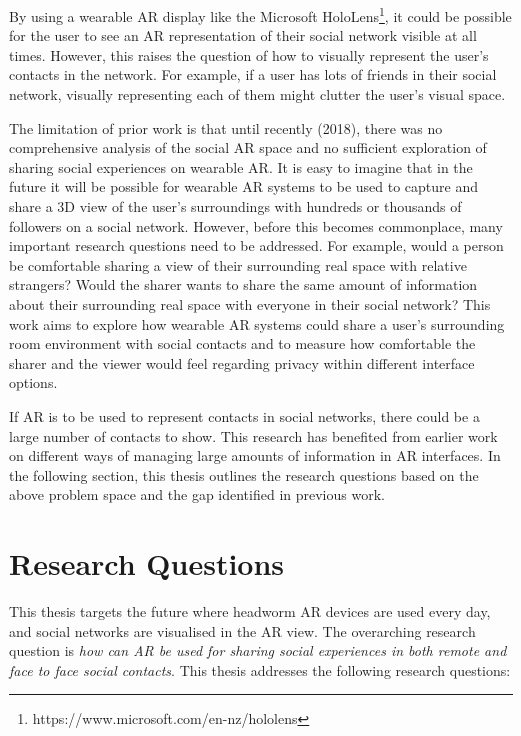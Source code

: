 By using a wearable AR display like the Microsoft HoloLens\footnote{https://www.microsoft.com/en-nz/hololens}, it could be possible for the user to see an AR representation of their social network visible at all times. However, this raises the question of how to visually represent the user's contacts in the network. For example, if a user has lots of friends in their social network, visually representing each of them might clutter the user's visual space.

The limitation of prior work is that until recently (2018), there was no comprehensive analysis of the social AR space and no sufficient exploration of sharing social experiences on wearable AR. It is easy to imagine that in the future it will be possible for wearable AR systems to be used to capture and share a 3D view of the user's surroundings with hundreds or thousands of followers on a social network. However, before this becomes commonplace, many important research questions need to be addressed. For example, would a person be comfortable sharing a view of their surrounding real space with relative strangers? Would the sharer wants to share the same amount of information about their surrounding real space with everyone in their social network? This work aims to explore how wearable AR systems could share a user's surrounding room environment with social contacts and to measure how comfortable the sharer and the viewer would feel regarding privacy within different interface options. 

If AR is to be used to represent contacts in social networks, there could be a large number of contacts to show. This research has benefited from earlier work on different ways of managing large amounts of information in AR interfaces. In the following section, this thesis outlines the research questions based on the above problem space and the gap identified in previous work.

\section{Research Questions}

This thesis targets the future where headworm AR devices are used every day, and social networks are visualised in the AR view. The overarching research question is \textit{how can AR be used for sharing social experiences in both remote and face to face social contacts}. This thesis addresses the following research questions: 

